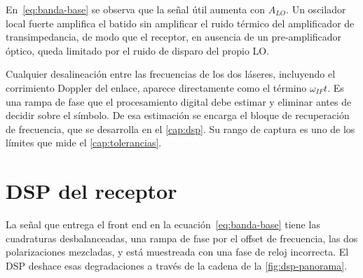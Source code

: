 En~\eqref{eq:banda-base} se observa que la se\~nal \'util aumenta con $A_{LO}$.
Un oscilador local fuerte amplifica el batido sin amplificar el ruido
t\'ermico del amplificador de transimpedancia, de modo que el receptor, en
ausencia de un pre-amplificador \'optico, queda limitado por el ruido de
disparo del propio LO.

Cualquier desalineaci\'on entre las frecuencias de los dos l\'aseres,
incluyendo el corrimiento Doppler del enlace, aparece directamente como el
t\'ermino $\omega_{IF}t$. Es una rampa de fase que el procesamiento digital
debe estimar y eliminar antes de decidir sobre el s\'imbolo. De esa
estimaci\'on se encarga el bloque de recuperaci\'on de frecuencia, que se
desarrolla en el \cref{cap:dsp}. Su rango de captura es uno de los l\'imites
que mide el \cref{cap:tolerancias}.

\section{DSP del receptor}
\label{sec:coh-dsp-panorama}

La se\~nal que entrega el front end en la ecuaci\'on~\eqref{eq:banda-base}
tiene las cuadraturas desbalanceadas, una rampa de fase por el offset de
frecuencia, las dos polarizaciones mezcladas, y est\'a muestreada con una fase
de reloj incorrecta. El DSP deshace esas degradaciones a trav\'es de la cadena
de la \cref{fig:dsp-panorama}.

